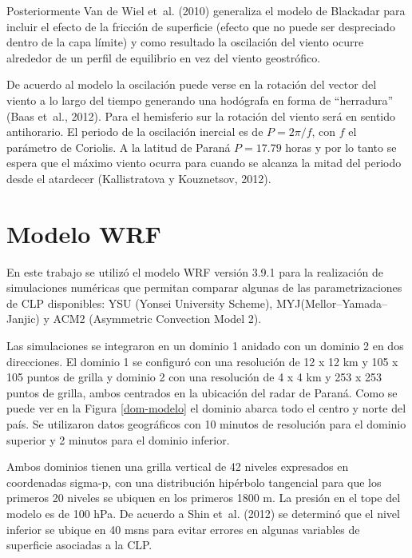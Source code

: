 \documentclass[12pt,spanish,oneside]{book}
\begin{document}
Posteriormente Van de Wiel et~al. (2010) generaliza el modelo de
Blackadar para incluir el efecto de la fricción de superficie (efecto
que no puede ser despreciado dentro de la capa límite) y como resultado
la oscilación del viento ocurre alrededor de un perfil de equilibrio en
vez del viento geostrófico.

De acuerdo al modelo la oscilación puede verse en la rotación del vector
del viento a lo largo del tiempo generando una hodógrafa en forma de
``herradura'' (Baas et~al., 2012). Para el hemisferio sur la rotación
del viento será en sentido antihorario. El periodo de la oscilación
inercial es de \(P = 2\pi/f\), con \(f\) el parámetro de Coriolis. A la
latitud de Paraná \(P = 17.79\) horas y por lo tanto se espera que el
máximo viento ocurra para cuando se alcanza la mitad del periodo desde
el atardecer (Kallistratova y Kouznetsov, 2012).

\section{Modelo WRF}\label{modelo-wrf}

En este trabajo se utilizó el modelo WRF versión 3.9.1 para la
realización de simulaciones numéricas que permitan comparar algunas de
las parametrizaciones de CLP disponibles: YSU (Yonsei University
Scheme), MYJ(Mellor--Yamada--Janjic) y ACM2 (Asymmetric Convection Model
2).

Las simulaciones se integraron en un dominio 1 anidado con un dominio 2
en dos direcciones. El dominio 1 se configuró con una resolución de 12 x
12 km y 105 x 105 puntos de grilla y dominio 2 con una resolución de 4 x
4 km y 253 x 253 puntos de grilla, ambos centrados en la ubicación del
radar de Paraná. Como se puede ver en la Figura \ref{dom-modelo} el
dominio abarca todo el centro y norte del país. Se utilizaron datos
geográficos con 10 minutos de resolución para el dominio superior y 2
minutos para el dominio inferior.

Ambos dominios tienen una grilla vertical de 42 niveles expresados en
coordenadas sigma-p, con una distribución hipérbolo tangencial para que
los primeros 20 niveles se ubiquen en los primeros 1800 m. La presión en
el tope del modelo es de 100 hPa. De acuerdo a Shin et~al. (2012) se
determinó que el nivel inferior se ubique en 40 msns para evitar errores
en algunas variables de superficie asociadas a la CLP.
\end{document}
